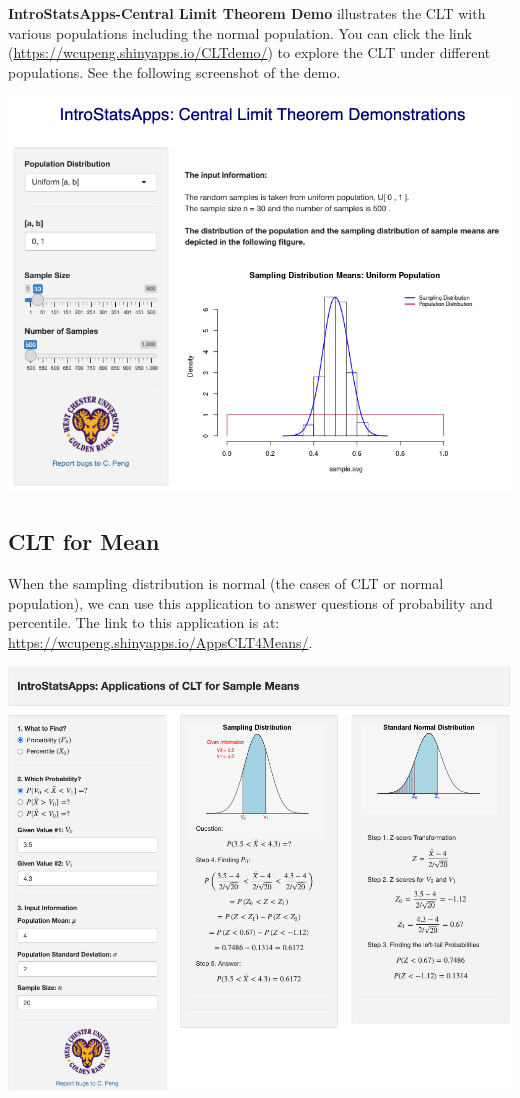 \documentclass[
]{book}
\begin{document}
\textbf{IntroStatsApps-Central Limit Theorem Demo} illustrates the CLT with various populations including the normal population. You can click the link (\url{https://wcupeng.shinyapps.io/CLTdemo/}) to explore the CLT under different populations. See the following screenshot of the demo.

\begin{center}\includegraphics[width=1\linewidth]{week05/cltDemo} \end{center}

\hypertarget{clt-for-mean}{%
\subsection{CLT for Mean}\label{clt-for-mean}}

When the sampling distribution is normal (the cases of CLT or normal population), we can use this application to answer questions of probability and percentile. The link to this application is at: \url{https://wcupeng.shinyapps.io/AppsCLT4Means/}.

\begin{center}\includegraphics[width=1\linewidth]{week05/cltMean} \end{center}
\end{document}
